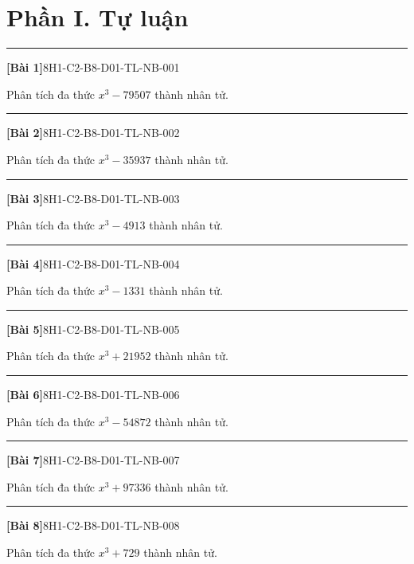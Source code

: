 \documentclass[12pt,a4paper]{article}
\newif\ifloigiai
\newenvironment{cauhoi}[2]{%
  \par\medskip\noindent\rule{\textwidth}{0.4pt}\par\nopagebreak
  \noindent\textbf{[#1]}\hfill{\scriptsize\ttfamily #2}\par\nopagebreak\smallskip}{\par}
\newcommand{\loigiai}[1]{\ifloigiai\par\smallskip\noindent\textit{Lời giải.} #1\par\fi}
\begin{document}
\section*{Phần I. Tự luận}
\begin{cauhoi}{Bài 1}{8H1-C2-B8-D01-TL-NB-001}
Phân tích đa thức $x^{3}-79507$ thành nhân tử.
\loigiai{Áp dụng hằng đẳng thức $a^{3}-b^{3}=(a-b)(a^{2}+ab+b^{2})$ với $b=43$: $x^{3}-79507=(x-43)(x^{2}+43x+1849)$.}
\end{cauhoi}
\begin{cauhoi}{Bài 2}{8H1-C2-B8-D01-TL-NB-002}
Phân tích đa thức $x^{3}-35937$ thành nhân tử.
\loigiai{Áp dụng hằng đẳng thức $a^{3}-b^{3}=(a-b)(a^{2}+ab+b^{2})$ với $b=33$: $x^{3}-35937=(x-33)(x^{2}+33x+1089)$.}
\end{cauhoi}
\begin{cauhoi}{Bài 3}{8H1-C2-B8-D01-TL-NB-003}
Phân tích đa thức $x^{3}-4913$ thành nhân tử.
\loigiai{Áp dụng hằng đẳng thức $a^{3}-b^{3}=(a-b)(a^{2}+ab+b^{2})$ với $b=17$: $x^{3}-4913=(x-17)(x^{2}+17x+289)$.}
\end{cauhoi}
\begin{cauhoi}{Bài 4}{8H1-C2-B8-D01-TL-NB-004}
Phân tích đa thức $x^{3}-1331$ thành nhân tử.
\loigiai{Áp dụng hằng đẳng thức $a^{3}-b^{3}=(a-b)(a^{2}+ab+b^{2})$ với $b=11$: $x^{3}-1331=(x-11)(x^{2}+11x+121)$.}
\end{cauhoi}
\begin{cauhoi}{Bài 5}{8H1-C2-B8-D01-TL-NB-005}
Phân tích đa thức $x^{3}+21952$ thành nhân tử.
\loigiai{Áp dụng hằng đẳng thức $a^{3}+b^{3}=(a+b)(a^{2}-ab+b^{2})$ với $b=28$: $x^{3}+21952=(x+28)(x^{2}-28x+784)$.}
\end{cauhoi}
\begin{cauhoi}{Bài 6}{8H1-C2-B8-D01-TL-NB-006}
Phân tích đa thức $x^{3}-54872$ thành nhân tử.
\loigiai{Áp dụng hằng đẳng thức $a^{3}-b^{3}=(a-b)(a^{2}+ab+b^{2})$ với $b=38$: $x^{3}-54872=(x-38)(x^{2}+38x+1444)$.}
\end{cauhoi}
\begin{cauhoi}{Bài 7}{8H1-C2-B8-D01-TL-NB-007}
Phân tích đa thức $x^{3}+97336$ thành nhân tử.
\loigiai{Áp dụng hằng đẳng thức $a^{3}+b^{3}=(a+b)(a^{2}-ab+b^{2})$ với $b=46$: $x^{3}+97336=(x+46)(x^{2}-46x+2116)$.}
\end{cauhoi}
\begin{cauhoi}{Bài 8}{8H1-C2-B8-D01-TL-NB-008}
Phân tích đa thức $x^{3}+729$ thành nhân tử.
\loigiai{Áp dụng hằng đẳng thức $a^{3}+b^{3}=(a+b)(a^{2}-ab+b^{2})$ với $b=9$: $x^{3}+729=(x+9)(x^{2}-9x+81)$.}
\end{cauhoi}
\end{document}
